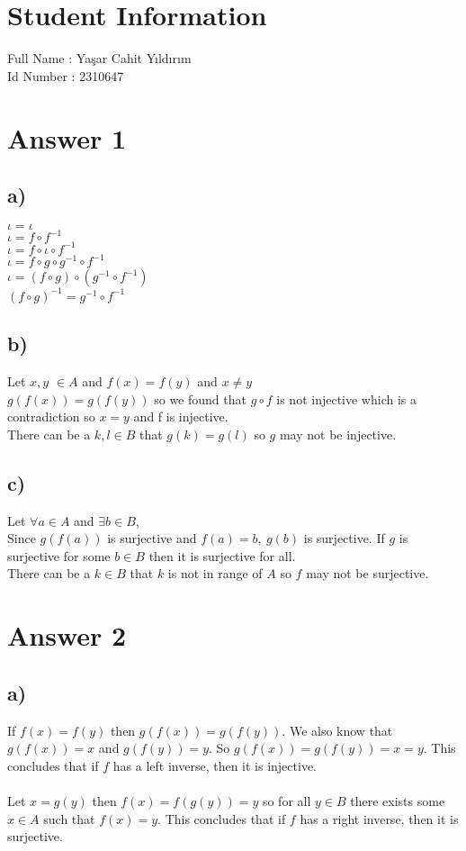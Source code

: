 \documentclass[12pt]{article}
\begin{document}
\section*{Student Information } 
Full Name : Yaşar Cahit Yıldırım \\
Id Number : 2310647 \\

\section*{Answer 1}
\subsection*{a)}
$\iota = \iota$ \\
$\iota = f \circ f^{-1}$ \\
$\iota = f \circ \iota \circ f^{-1}$ \\
$\iota = f \circ g \circ g^{-1} \circ f^{-1}$ \\
$\iota = (f \circ g) \circ (g^{-1} \circ f^{-1})$ \\
$(f \circ g)^{-1} = g^{-1} \circ f^{-1}$ \\
\subsection*{b)}
Let $x, y$ $\in A$ and $f(x) = f(y)$ and $x \neq y$\\
$g(f(x)) = g(f(y))$ so we found that $g \circ f$ is not injective which is a contradiction so $x = y$ and f is injective.\\
There can be a $k,l \in B$ that $g(k) = g(l)$ so $g$ may not be injective. 
\subsection*{c)}
Let $\forall a \in A$ and $\exists b \in B$,\\
Since $g(f(a))$ is surjective and $f(a) = b,\ g(b)$ is surjective. If $g$ is surjective for some $b \in B$ then it is surjective for all.\\
There can be a $k \in B$ that $k$ is not in range of $A$ so $f$ may not be surjective.
\section*{Answer 2}
\subsection*{a)}
If $f(x) = f(y)$ then $g(f(x)) = g(f(y))$. We also know that $g(f(x)) = x$ and $g(f(y)) = y$. So $g(f(x)) = g(f(y)) = x = y$. This concludes that if $f$ has a left inverse, then it is injective.\\
\\
Let $x = g(y)$ then $f(x) = f(g(y)) = y$ so for all $y \in B$ there exists some $x \in A$ such that $f(x) = y$. This concludes that if $f$ has a right inverse, then it is surjective.\\
\end{document}
